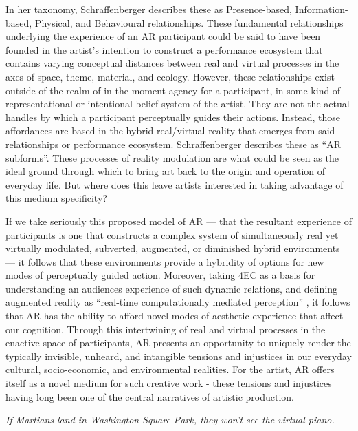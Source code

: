 In her taxonomy, Schraffenberger describes these as Presence-based, Information-based, Physical, and Behavioural relationships. These fundamental relationships underlying the experience of an AR participant could be said to have been founded in the artist’s intention to construct a performance ecosystem that contains varying conceptual distances between real and virtual processes in the axes of space, theme, material, and ecology. However, these relationships exist outside of the realm of in-the-moment agency for a participant, in some kind of representational or intentional belief-system of the artist. They are not the actual handles by which a participant perceptually guides their actions. Instead, those affordances are based in the hybrid real/virtual reality that emerges from said relationships or performance ecosystem. Schraffenberger describes these as “AR subforms”. These processes of reality modulation are what could be seen as the ideal ground through which to bring art back to the origin and operation of everyday life. But where does this leave artists interested in taking advantage of this medium specificity? 

If we take seriously this proposed model of AR — that the resultant experience of participants is one that constructs a complex system of simultaneously real yet virtually modulated, subverted, augmented, or diminished hybrid environments — it follows that these environments provide a hybridity of options for new modes of perceptually guided action. Moreover, taking 4EC as a basis for understanding an audiences experience of such dynamic relations, and defining augmented reality as “real-time computationally mediated perception” \citep[]{chevalier2020}, it follows that AR has the ability to afford novel modes of aesthetic experience that affect our cognition. Through this intertwining of real and virtual processes in the enactive space of participants, AR presents an opportunity to uniquely render the typically invisible, unheard, and intangible tensions and injustices in our everyday cultural, socio-economic, and environmental realities. For the artist, AR offers itself as a novel medium for such creative work - these tensions and injustices having long been one of the central narratives of artistic production.
\clearpage
\newpage


\epigraph{\textit{If Martians land in Washington Square Park, they won't see the virtual piano.}}{\citep[p. 229]{chalmers2022}}
